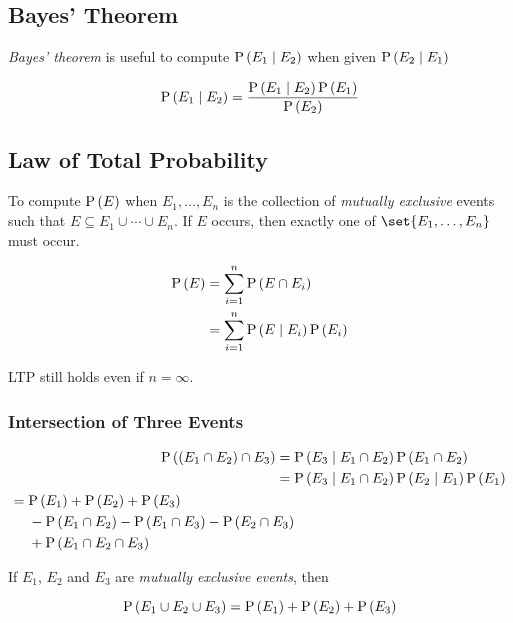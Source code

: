 \subsection{Bayes' Theorem}

\begin{definition}
    \textit{Bayes' theorem} is useful to compute $\mathrm{P} \left( E_1 \mid E_2 \right)$ when given $\mathrm{P} \left( E_2 \mid E_1 \right)$
    
    \begin{equation}
        \mathrm{P} \left( E_1 \mid E_2 \right) = \frac{\mathrm{P} \left( E_1 \mid E_2 \right) \mathrm{P} \left( E_1 \right)}{\mathrm{P} \left( E_2 \right)}
    \end{equation}
\end{definition}

\subsection{Law of Total Probability}

\begin{definition}
    To compute $\mathrm{P} \left( E \right)$ when $E_1, \ldots, E_n$ is the collection of \textit{mutually exclusive} events such that $E \subseteq E_1 \cup \cdots \cup E_n$. If $E$ occurs, then exactly one of $\set{E_1, \ldots, E_n}$ must occur.
    
    \begin{align}
        \mathrm{P} \left( E \right)
            &= \sum \limits_{i=1}^{n} \mathrm{P} \left( E \cap E_i \right) \\
            &= \sum \limits_{i=1}^{n} \mathrm{P} \left( E \mid E_i \right) \mathrm{P} \left( E_i \right)
    \end{align}

    LTP still holds even if $n = \infty$.
\end{definition}

\subsubsection{Intersection of Three Events}

\begin{definition}
    \begin{align}
        \mathrm{P} \left( (E_1 \cap E_2) \cap E_3 \right)
            ={}& \mathrm{P} \left( E_3 \mid E_1 \cap E_2 \right) \mathrm{P} \left( E_1 \cap E_2 \right) \\
            ={}& \mathrm{P} \left( E_3 \mid E_1 \cap E_2 \right) \mathrm{P} \left( E_2 \mid E_1 \right) \mathrm{P} \left( E_1 \right) \\
            \begin{split}
                ={}& \mathrm{P} \left( E_1 \right) + \mathrm{P} \left( E_2 \right) + \mathrm{P} \left( E_3 \right) \\
                &- \mathrm{P} \left( E_1 \cap E_2 \right) - \mathrm{P} \left( E_1 \cap E_3 \right) - \mathrm{P} \left( E_2 \cap E_3 \right) \\
                &+ \mathrm{P} \left( E_1 \cap E_2 \cap E_3 \right)
            \end{split}
    \end{align}
    
    If $E_1$, $E_2$ and $E_3$ are \textit{mutually exclusive events}, then
    
    \begin{equation}
        \mathrm{P} \left( E_1 \cup E_2 \cup E_3 \right) = \mathrm{P} \left( E_1 \right) + \mathrm{P} \left( E_2 \right) + \mathrm{P} \left( E_3 \right)
    \end{equation}
\end{definition}
